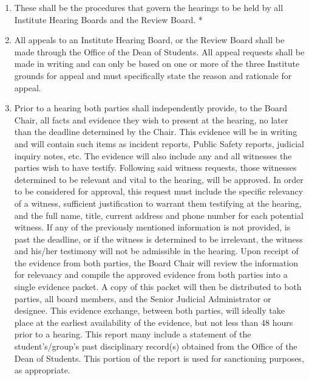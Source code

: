
\begin{enumerate}
    \item These shall be the procedures that govern the hearings to be held by all Institute Hearing Boards and the Review Board. *
    \item All appeals to an Institute Hearing Board, or the Review Board shall be made through the Office of the Dean of Students. All appeal requests shall be made in writing and can only be based on one or more of the three Institute grounds for appeal and must specifically state the reason and rationale for appeal.
    \item Prior to a hearing both parties shall independently provide, to the Board Chair, all facts and evidence they wish to present at the hearing, no later than the deadline determined by the Chair. This evidence will be in writing and will contain such items as incident reports, Public Safety reports, judicial inquiry notes, etc. The evidence will also include any and all witnesses the parties wish to have testify. Following said witness requests, those witnesses determined to be relevant and vital to the hearing, will be approved. In order to be considered for approval, this request must include the specific relevancy of a witness, sufficient justification to warrant them testifying at the hearing, and the full name, title, current address and phone number for each potential witness. If any of the previously mentioned information is not provided, is past the deadline, or if the witness is determined to be irrelevant, the witness and his/her testimony will not be admissible in the hearing. Upon receipt of the evidence from both parties, the Board Chair will review the information for relevancy and compile the approved evidence from both parties into a single evidence packet. A copy of this packet will then be distributed to both parties, all board members, and the Senior Judicial Administrator or designee. This evidence exchange, between both parties, will ideally take place at the earliest availability of the evidence, but not less than 48 hours prior to a hearing. This report many include a statement of the student's/group's past disciplinary record(s) obtained from the Office of the Dean of Students. This portion of the report is used for sanctioning purposes, as appropriate.

\end{enumerate}
